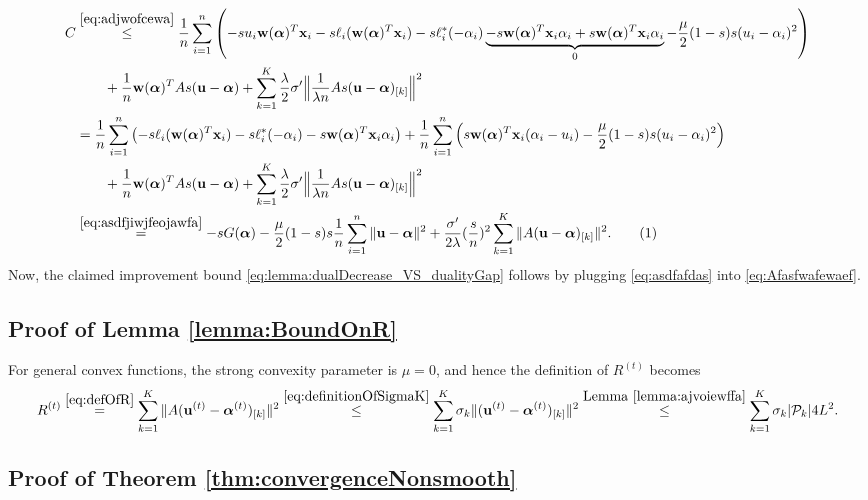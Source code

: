 \documentclass{article}
\newcommand\tagthis{\addtocounter{equation}{1}\tag{\theequation}}
\newcommand{\xv}{ {\bf x}}
\newcommand{\uv}{ {\bf u}}
\newcommand{\wv}{ {\bf w}}
\newcommand{\alphav}{ {\boldsymbol \alpha}}
\newcommand{\0}{ {\bf 0}}
\newcommand{\vsubset}[2]{#1_{[#2]}}
\newcommand{\vc}[2]{#1^{(#2)}}                   %
\theoremstyle{plain}
\theoremstyle{definition}
\begin{document}
\begin{align*}
C
&\overset{
\eqref{eq:adjwofcewa}}
{\leq}
  \frac1n 
 \sum_{i =1}^n 
 \left( 
-s u_i \wv(\alphav)^T \xv_i
  -s\ell_i(\wv(\alphav)^T \xv_i)
  -s 
\ell_i^*(-\alpha_i )
\underbrace{-s \wv(\alphav)^T \xv_i \alpha_i
+s \wv(\alphav)^T \xv_i \alpha_i
}_{0}
-
\frac{\mu}{2}
(1-s)s (u_i -\alpha_i)^2
\right)
\\&\qquad  +\frac1n  
\wv(\alphav)^T A  s (\uv  - \alphav )
 + \sum_{k=1}^K 
\frac\lambda2
 \sigma'   \Big\|\frac1{\lambda n} A \vsubset{s (\uv  - \alphav )}{k}\Big\|^2 
\\
&=
  \frac1n 
 \sum_{i =1}^n 
 \left( 
  -s\ell_i(\wv(\alphav)^T \xv_i)
  -s\ell_i^*(-\alpha_i )
  -s \wv(\alphav)^T \xv_i \alpha_i
\right)
+
  \frac1n 
 \sum_{i =1}^n 
 \left(  s \wv(\alphav)^T \xv_i
( \alpha_i-u_i )
 -
\frac{\mu}{2}
(1-s)s (u_i -\alpha_i)^2
\right)
\\&\qquad  +\frac1n  
\wv(\alphav)^T A  s (\uv  - \alphav )
 + \sum_{k=1}^K 
\frac\lambda2
 \sigma'   \Big\|\frac1{\lambda n} A \vsubset{s (\uv  - \alphav )}{k}\Big\|^2  
\\
&\overset{\eqref{eq:asdfjiwjfeojawfa}}{=}
 -s G(\alphav)
-
\frac{\mu}{2}
(1-s)s 
  \frac1n 
 \sum_{i =1}^n 
 \|\uv-\alphav\|^2 
 + 
\frac{\sigma'}{2\lambda }
(\frac s{  n})^2
\sum_{k=1}^K   
  \| A \vsubset{  (\uv  - \alphav )}{k}\|^2.
  \tagthis 
  \label{eq:asdfafdas}
 \end{align*}
Now, the claimed improvement bound
\eqref{eq:lemma:dualDecrease_VS_dualityGap}
follows
by plugging 
\eqref{eq:asdfafdas}
into \eqref{eq:Afasfwafewaef}.




\subsection{Proof of Lemma 
\ref{lemma:BoundOnR}}


For general convex functions, the strong convexity parameter is 
$\mu=0$, and hence the definition of $\vc{R}{t}$ becomes
\begin{align*} 
\vc{R}{t}
\overset{\eqref{eq:defOfR}}{=}
  \sum _{k=1}^K   
  \| A \vsubset{  (\vc{\uv} {t} - \vc{\alphav}{t} )}{k}\|^2
\overset{\eqref{eq:definitionOfSigmaK}}{\leq}   
\sum _{k=1}^K 
\sigma_k  
  \|   \vsubset{  (\vc{\uv} {t} - \vc{\alphav}{t} )}{k}\|^2
\overset{\mbox{Lemma \ref{lemma:ajvoiewffa}}}{\leq}   
\sum _{k=1}^K 
\sigma_k  |\mathcal{P}_k| 4L^2.
\end{align*}

 
\subsection{Proof of Theorem \ref{thm:convergenceNonsmooth}}
\end{document}
